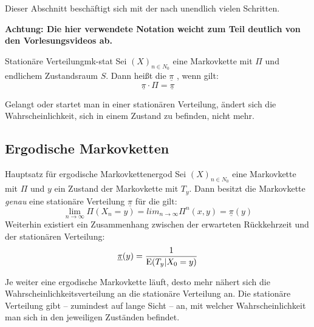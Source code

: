 \newcommand{\stat}{\underline{\pi}} %

Dieser Abschnitt beschäftigt sich mit der  nach unendlich vielen Schritten.

\textbf{Achtung: Die hier verwendete
Notation weicht zum Teil deutlich von den Vorlesungsvideos ab.}

\begin{definition}{Stationäre Verteilung}{mk-stat}
Sei $(X)_{n\in N_0}$ eine Markovkette mit 
$\Pi$ und endlichem Zustandsraum $S$. Dann heißt die
 $\stat$ ,
wenn gilt:
\[
\stat\cdot\Pi = \stat
\]
\end{definition}

Gelangt oder startet man in einer stationären Verteilung, ändert sich die
Wahrscheinlichkeit, sich in einem Zustand zu befinden, nicht mehr.

\subsection{Ergodische Markovketten}

\begin{theorem}{Hauptsatz für ergodische Markovketten}{ergod}
Sei $(X)_{n\in N_0}$ eine  Markovkette mit
 $\Pi$ und $y$ ein Zustand der Markovkette
mit  $T_y$. Dann
besitzt die Markovkette \emph{genau} eine stationäre Verteilung $\stat$
für die gilt:
\[
\lim_{n\to\infty}\Pi(X_n = y) = lim_{n\to\infty}\Pi^n(x, y) = \stat(y)
\]
Weiterhin existiert ein Zusammenhang zwischen der erwarteten Rückkehrzeit und
der stationären Verteilung:
\[
\stat(y) = \frac{1}{\E(T_y|X_0=y)}
\]
\end{theorem}

Je weiter eine ergodische Markovkette läuft, desto mehr nähert sich die
Wahrscheinlichkeitsverteilung an die stationäre Verteilung an. Die stationäre
Verteilung gibt – zumindest auf lange Sicht – an, mit welcher Wahrscheinlichkeit
man sich in den jeweiligen Zuständen befindet.

